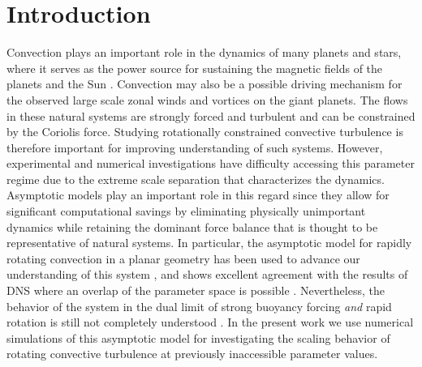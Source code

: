 %
\section{Introduction}
\label{S:intro}


%

Convection plays an important role in the dynamics of many planets and stars, where it serves as the power source for sustaining the magnetic fields of the planets \citep{sS10,cJ11b,pR13,jmA15} and the Sun \citep{pC14}. Convection may also be a possible driving mechanism for the observed large scale zonal winds  \citep[e.g.][]{mH16} and vortices \citep[e.g.][]{lS22} on the giant planets. The flows in these natural systems are strongly forced and turbulent and can be constrained by the Coriolis force. 
Studying rotationally constrained convective turbulence is therefore important for improving understanding of such systems.
However, experimental \citep{rE14,jC15,mM21,tV21} and numerical \citep{tG16,aG21,mY22} investigations have difficulty accessing this parameter regime due to the extreme scale separation that characterizes the dynamics.
Asymptotic models play an important role in this regard since they allow for significant computational savings by eliminating physically unimportant dynamics while retaining the dominant force balance that is thought to be representative of natural systems.
In particular, the asymptotic model for rapidly rotating convection in a planar geometry has been used to advance our understanding of this system \citep{kJ98a}, and shows excellent agreement with the results of DNS where an overlap of the parameter space is possible \citep{sS14,mP16}. Nevertheless, the behavior of the system in the dual limit of strong buoyancy forcing \textit{and} rapid rotation is still not completely understood \citep{sM21}.
In the present work we use numerical simulations of this asymptotic model for investigating the scaling behavior of rotating convective turbulence at previously inaccessible parameter values.





